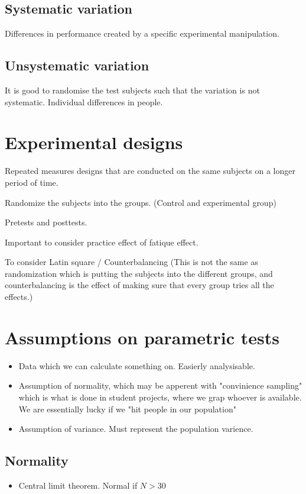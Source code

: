 \documentclass[a4paper]{article}
\begin{document}
\subsection{Systematic variation}
Differences in performance created by a specific experimental manipulation.

\subsection{Unsystematic variation}
It is good to randomise the test subjects such that the variation is not systematic. 
Individual differences in people.

\section{Experimental designs}
Repeated measures designs that are conducted on the same subjects on a longer period of time.

Randomize the subjects into the groups. (Control and experimental group)

Pretests and posttests. 


Important to consider practice effect of fatique effect. 

To consider Latin square / Counterbalancing (This is not the same as randomization which is putting the subjects into the different groups, and counterbalancing is the effect of making sure that every group tries all the effects.)

\section{Assumptions on parametric tests}
\begin{itemize}
	\item Data which we can calculate something on. Easierly analysisable. 
	\item Assumption of normality, which may be apperent with "convinience sampling" which is what is done in student projects, where we grap whoever is available. We are essentially lucky if we "hit people in our population"
	\item Assumption of variance. Must represent the population varience.
\end{itemize}

\subsection{Normality}
\begin{itemize}
	\item Central limit theorem. Normal if $ N > 30 $ 
\end{itemize}
\end{document}
